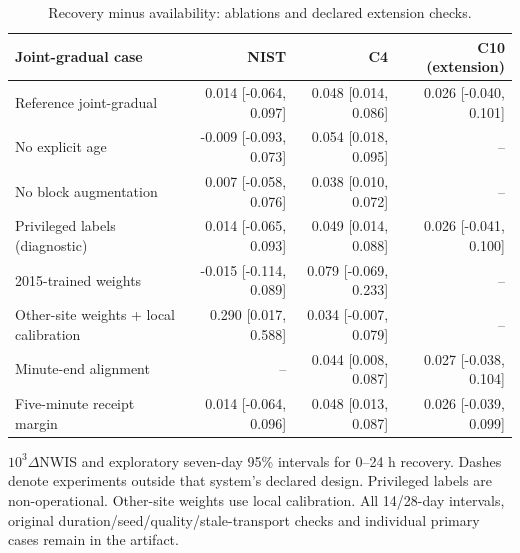 \begin{table}[t]
\centering\footnotesize
\caption{Recovery minus availability: ablations and declared extension checks.}
\label{tab:ablations}
\setlength{\tabcolsep}{4pt}
\begin{tabular}{lrrr}
\hline
Joint-gradual case & NIST & C4 & C10 (extension) \\
\hline
Reference joint-gradual & 0.014 [-0.064, 0.097] & 0.048 [0.014, 0.086] & 0.026 [-0.040, 0.101] \\
No explicit age & -0.009 [-0.093, 0.073] & 0.054 [0.018, 0.095] & -- \\
No block augmentation & 0.007 [-0.058, 0.076] & 0.038 [0.010, 0.072] & -- \\
Privileged labels (diagnostic) & 0.014 [-0.065, 0.093] & 0.049 [0.014, 0.088] & 0.026 [-0.041, 0.100] \\
2015-trained weights & -0.015 [-0.114, 0.089] & 0.079 [-0.069, 0.233] & -- \\
Other-site weights + local calibration & 0.290 [0.017, 0.588] & 0.034 [-0.007, 0.079] & -- \\
Minute-end alignment & -- & 0.044 [0.008, 0.087] & 0.027 [-0.038, 0.104] \\
Five-minute receipt margin & 0.014 [-0.064, 0.096] & 0.048 [0.013, 0.087] & 0.026 [-0.039, 0.099] \\
\hline
\end{tabular}
\par\smallskip
\begin{minipage}{\textwidth}\scriptsize
$10^3\Delta$NWIS and exploratory seven-day 95\% intervals for 0--24 h recovery. Dashes denote experiments outside that system's declared design. Privileged labels are non-operational. Other-site weights use local calibration. All 14/28-day intervals, original duration/seed/quality/stale-transport checks and individual primary cases remain in the artifact.
\end{minipage}
\end{table}
